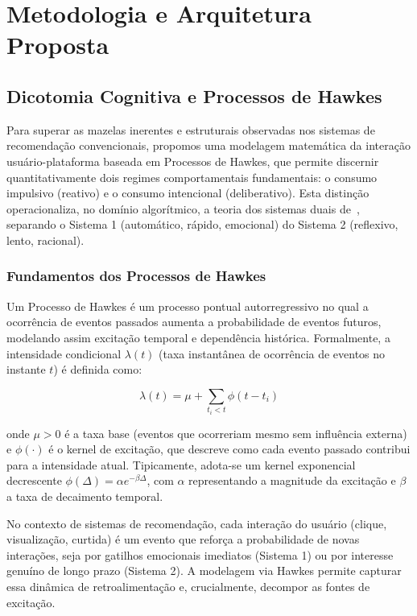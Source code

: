 \documentclass{sbc2023}
\begin{document}
\section{Metodologia e Arquitetura Proposta} \label{sec:method}

\subsection{Dicotomia Cognitiva e Processos de Hawkes} \label{sec:hawkes_method}

Para superar as mazelas inerentes e estruturais observadas nos sistemas de recomendação convencionais, propomos uma modelagem matemática da interação usuário-plataforma baseada em Processos de Hawkes, que permite discernir quantitativamente dois regimes comportamentais fundamentais: o consumo impulsivo (reativo) e o consumo intencional (deliberativo). Esta distinção operacionaliza, no domínio algorítmico, a teoria dos sistemas duais de~\citet{kahneman2011}, separando o Sistema 1 (automático, rápido, emocional) do Sistema 2 (reflexivo, lento, racional).

\subsubsection{Fundamentos dos Processos de Hawkes} \label{sec:hawkes_foundations}

Um Processo de Hawkes é um processo pontual autorregressivo no qual a ocorrência de eventos passados aumenta a probabilidade de eventos futuros, modelando assim excitação temporal e dependência histórica. Formalmente, a intensidade condicional $\lambda(t)$ (taxa instantânea de ocorrência de eventos no instante $t$) é definida como:

\begin{equation} \label{eq:hawkes_base}
    \lambda(t) = \mu + \sum_{t_i < t} \phi(t - t_i)
\end{equation}

onde $\mu > 0$ é a taxa base (eventos que ocorreriam mesmo sem influência externa) e $\phi(\cdot)$ é o kernel de excitação, que descreve como cada evento passado contribui para a intensidade atual. Tipicamente, adota-se um kernel exponencial decrescente $\phi(\Delta) = \alpha e^{-\beta \Delta}$, com $\alpha$ representando a magnitude da excitação e $\beta$ a taxa de decaimento temporal.

No contexto de sistemas de recomendação, cada interação do usuário (clique, visualização, curtida) é um evento que reforça a probabilidade de novas interações, seja por gatilhos emocionais imediatos (Sistema 1) ou por interesse genuíno de longo prazo (Sistema 2). A modelagem via Hawkes permite capturar essa dinâmica de retroalimentação e, crucialmente, decompor as fontes de excitação.
\end{document}
